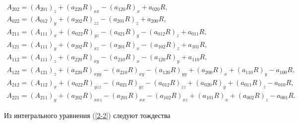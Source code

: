 \begin{gather*}
A_{202}=(A_{201})_{z}+(a_{220}R)_{xx}-(a_{120}R)_{x}+a_{020}R,\\


%


A_{022}=(A_{012})_{y}+(a_{202}R)_{zz}-(a_{201}R)_{z}+a_{200}R,\\


%


A_{211}=(A_{111})_{x}+(a_{022}R)_{yz}-(a_{021}R)_{y}


-(a_{012}R)_{z}+a_{011}R,\\


%


A_{121}=(A_{111})_{y}+(a_{202}R)_{xz}-(a_{201}R)_{x}


-(a_{102}R)_{z}+a_{101}R,\\


%


A_{112}=(A_{111})_{z}+(a_{220}R)_{xy}-(a_{210}R)_{x}


-(a_{120}R)_{y}+a_{110}R,\\


%


A_{122}=(A_{121})_{z}+(a_{220}R)_{xyy}-(a_{210}R)_{xy}-(a_{120}R)_{yy}+


(a_{200}R)_{x}+(a_{110}R)_{y}-a_{100}R,\\


%


A_{212}=(A_{112})_{x}+(a_{022}R)_{yzz}-(a_{021}R)_{yz}-(a_{012}R)_{zz}+


(a_{020}R)_{y}+(a_{011}R)_{z}-a_{010}R,\\


%


A_{221}=(A_{211})_{y}+(a_{202}R)_{xxz}-(a_{201}R)_{xx}-(a_{102}R)_{xz}+


(a_{101}R)_{x}+(a_{002}R)_{z}-a_{001}R.


\end{gather*}





Из интегрального уравнения (\ref{2-2}) следуют тождества



